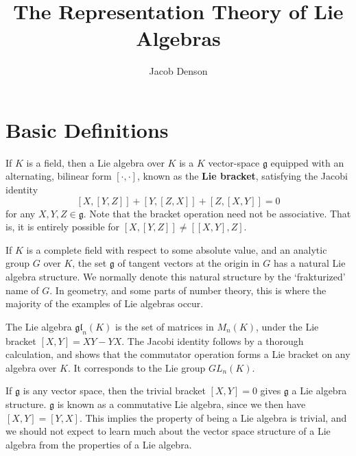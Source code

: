 

\title{The Representation Theory of Lie Algebras}
\author{Jacob Denson}




\maketitle

\tableofcontents


\chapter{Basic Definitions}

If $K$ is a field, then a Lie algebra over $K$ is a $K$ vector-space $\mathfrak{g}$ equipped with an alternating, bilinear form $[\cdot, \cdot]$, known as the {\bf Lie bracket}, satisfying the Jacobi identity
%
\[ [X,[Y,Z]] + [Y,[Z,X]] + [Z,[X,Y]] = 0 \]
%
for any $X,Y,Z \in \mathfrak{g}$. Note that the bracket operation need not be associative. That is, it is entirely possible for $[X,[Y,Z]] \neq [[X,Y],Z]$.

If $K$ is a complete field with respect to some absolute value, and an analytic group $G$ over $K$, the set $\mathfrak{g}$ of tangent vectors at the origin in $G$ has a natural Lie algebra structure. We normally denote this natural structure by the `frakturized' name of $G$. In geometry, and some parts of number theory, this is where the majority of the examples of Lie algebras occur.

\begin{example}
    The Lie algebra $\mathfrak{gl}_n(K)$ is the set of matrices in $M_n(K)$, under the Lie bracket $[X,Y] = XY - YX$. The Jacobi identity follows by a thorough calculation, and shows that the commutator operation forms a Lie bracket on any algebra over $K$. It corresponds to the Lie group $GL_n(K)$.
\end{example}

\begin{example}
    If $\mathfrak{g}$ is any vector space, then the trivial bracket $[X,Y] = 0$ gives $\mathfrak{g}$ a Lie algebra structure. $\mathfrak{g}$ is known as a commutative Lie algebra, since we then have $[X,Y] = [Y,X]$. This implies the property of being a Lie algebra is trivial, and we should not expect to learn much about the vector space structure of a Lie algebra from the properties of a Lie algebra.
\end{example}

